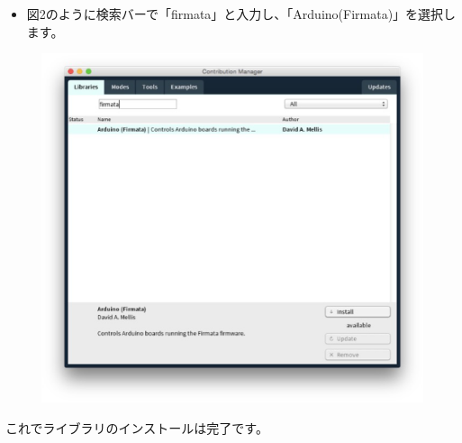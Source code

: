 \documentclass[11pt,a4paper]{jarticle}
\begin{document}
\newpage

\begin{itemize}
\item 図2のように検索バーで「firmata」と入力し、「Arduino(Firmata)」を選択します。
\end{itemize}

\begin{figure}[htbp]
  \centering
  \includegraphics[width=0.6\columnwidth]{img/eps/how_to_install_the_Firmata_library2.eps}
  \label{figure:switch}
\end{figure}

これでライブラリのインストールは完了です。




\end{document}
